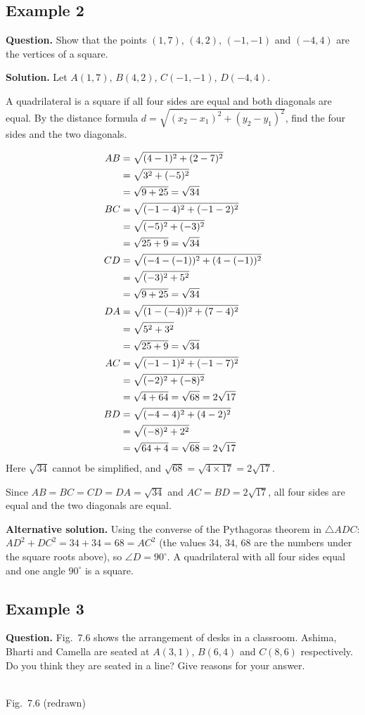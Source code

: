 
\subsection*{Example 2}
\textbf{Question.} Show that the points $(1,7)$, $(4,2)$, $(-1,-1)$ and $(-4,4)$ are the vertices of a square.

\textbf{Solution.} Let $A(1,7)$, $B(4,2)$, $C(-1,-1)$, $D(-4,4)$.

A quadrilateral is a square if all four sides are equal and both diagonals are equal. By the distance formula $d=\sqrt{(x_2-x_1)^2+(y_2-y_1)^2}$, find the four sides and the two diagonals.

\distnote
\begin{align*}
\distn{AB}{1}{7}{4}{2}\\
\distn{BC}{4}{2}{-1}{-1}\\
\distn{CD}{-1}{-1}{-4}{4}\\
\distn{DA}{-4}{4}{1}{7}\\
\dist{AC}{1}{7}{-1}{-1}{2\sqrt{17}}\\
\dist{BD}{4}{2}{-4}{4}{2\sqrt{17}}
\end{align*}
Here $\sqrt{34}$ cannot be simplified, and $\sqrt{68}=\sqrt{4\times17}=2\sqrt{17}$.

Since $AB=BC=CD=DA=\sqrt{34}$ and $AC=BD=2\sqrt{17}$, all four sides are equal and the two diagonals are equal.


\textbf{Alternative solution.} Using the converse of the Pythagoras theorem in $\triangle ADC$: $AD^2+DC^2=34+34=68=AC^2$ (the values $34$, $34$, $68$ are the numbers under the square roots above), so $\angle D=90^\circ$. A quadrilateral with all four sides equal and one angle $90^\circ$ is a square.

\subsection*{Example 3}
\textbf{Question.} Fig.\ 7.6 shows the arrangement of desks in a classroom. Ashima, Bharti and Camella are seated at $A(3,1)$, $B(6,4)$ and $C(8,6)$ respectively. Do you think they are seated in a line? Give reasons for your answer.

\begin{center}
\\
{\small Fig.\ 7.6 (redrawn)}
\end{center}

